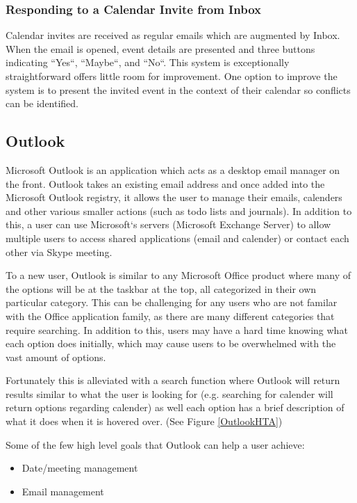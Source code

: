 \documentclass{sigchi}
\begin{document}
\subsubsection{Responding to a Calendar Invite from Inbox}
Calendar invites are received as regular emails which are augmented by Inbox.
When the email is opened, event details are presented and three buttons indicating ``Yes``, ``Maybe``, and ``No``.
This system is exceptionally straightforward offers little room for improvement.
One option to improve the system is to present the invited event in the context of their calendar so conflicts can be identified.
\FloatBarrier
\subsection{Outlook}
\FloatBarrier
Microsoft Outlook is an application which acts as a desktop email manager on the front. 
Outlook takes an existing email address and once added into the Microsoft Outlook registry, it allows the user to manage their emails, calenders and other various smaller actions (such as todo lists and journals). 
In addition to this, a user can use Microsoft`s servers (Microsoft Exchange Server) to allow multiple users to access shared applications (email and calender) or contact each other via Skype meeting.

To a new user, Outlook is similar to any Microsoft Office product where many of the options will be at the taskbar at the top, all categorized in their own particular category. 
This can be challenging for any users who are not familar with the Office application family, as there are many different categories that require searching. 
In addition to this, users may have a hard time knowing what each option does initially, which may cause users to be overwhelmed with the vast amount of options. 

Fortunately this is alleviated with a search function where Outlook will return results similar to what the user is looking for (e.g. searching for calender will return options regarding calender) as well each option has a brief description of what it does when it is hovered over. (See Figure \ref{OutlookHTA})

Some of the few high level goals that Outlook can help a user achieve:
\begin{itemize}
	\item Date/meeting management
	\item Email management
\end{itemize}
\end{document}
